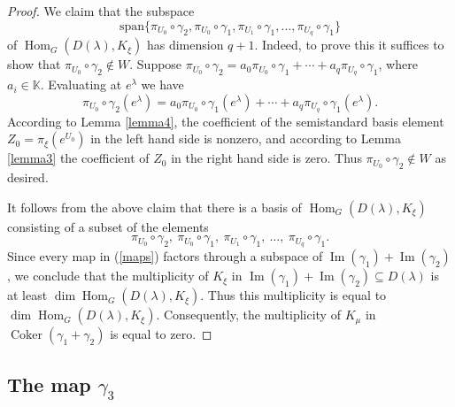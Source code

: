 \documentclass[11pt]{amsart}
\theoremstyle{definition}
\numberwithin{equation}{section}
\DeclareMathOperator{\Ima}{Im}
\DeclareMathOperator{\Hom}{Hom}
\DeclareMathOperator{\coker}{Coker}
\begin{document}
\begin{proof}
	
	We claim that the subspace \[\mathrm{span}\{\pi_{U_0} \circ \gamma_2, \pi_{U_0} \circ \gamma_1, \pi_{U_1} \circ \gamma_1 , \dots, \pi_{U_q} \circ \gamma_1 \} \] 
	of $\Hom_G(D(\lambda), K_\xi ) $ has dimension  $q+1$. Indeed, to prove this it suffices to show that $ \pi_{U_0} \circ \gamma_2 \notin W. $ Suppose $\pi_{U_0} \circ \gamma_2 = a_0\pi_{U_0} \circ \gamma_1 + \cdots + a_q\pi_{U_q} \circ \gamma_1$, where $a_i \in \mathbb{K}$. Evaluating at $e^\lambda$ we have \[\pi_{U_0} \circ \gamma_2(e^\lambda) = a_0\pi_{U_0} \circ \gamma_1(e^\lambda) + \cdots + a_q\pi_{U_q} \circ \gamma_1(e^\lambda). \] According to Lemma \ref{lemma4}, the coefficient of the semistandard basis element $Z_0=\pi_\xi(e^{U_0})$ in the left  hand side is nonzero, and according to Lemma \ref{lemma3} the coefficient of $Z_0$ in the right hand side is zero. Thus $ \pi_{U_0} \circ \gamma_2 \notin W $ as desired.
	
	It follows from the above claim that there is a basis of $\Hom_G(D(\lambda), K_\xi ) $ consisting of a subset of the elements 
	\begin{equation}\label{maps}\pi_{U_0} \circ \gamma_2, \ \pi_{U_0} \circ \gamma_1, \ \pi_{U_1} \circ \gamma_1 , \ \dots, \ \pi_{U_q} \circ \gamma_1.\end{equation}
	Since every map in (\ref{maps}) factors through a subspace of $\Ima(\gamma_1) + \Ima(\gamma_2)$, we conclude that the multiplicity of $K_\xi$ in $\Ima(\gamma_1) + \Ima(\gamma_2) \subseteq D(\lambda)$ is at least $\dim \Hom_G(D(\lambda), K_\xi )$. Thus this multiplicity is equal to $\dim \Hom_G(D(\lambda), K_\xi )$. Consequently, the multiplicity of $K_\mu$ in $\coker(\gamma_1 + \gamma_2)$ is equal to zero.
\end{proof}

\subsection{The map $\gamma_3$}\label{sec35} 
\end{document}
